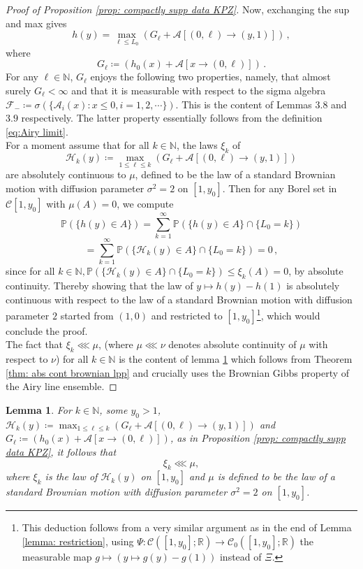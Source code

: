 \documentclass[12pt]{report}
\theoremstyle{plain}
\newtheorem{lemma}[theorem]{Lemma}
\newcommand{\N}{\ensuremath{\mathbb{N}}}
\newcommand{\R}{\ensuremath{\mathbb{R}}}
\begin{document}
\begin{proof}[Proof of Proposition \ref{prop: compactly supp data KPZ}]
    Now, exchanging the sup and max gives
    \[
    h(y) = \max_{\ell\leq L_0}(G_{\ell}+\mathcal{A}[(0,\ell)\to (y,1)])\,,
    \]
    where
    \[
    G_\ell \coloneqq (h_0(x)+\mathcal{A}[x\to(0,\ell)])\,.
    \]
    For any $\ell\in\N$, $G_{\ell}$ enjoys the following two properties, namely, that almost surely $G_{\ell}<\infty$ and that it is measurable with respect to the sigma algebra $\mathcal{F}_{-}\coloneqq \sigma(\{\mathcal{A}_i(x):x\leq0,i=1,2,\cdots\})$. This is the content of Lemmas $3.8$ and $3.9$ respectively. The latter property essentially follows from the definition \ref{eq:Airy limit}.\\

    For a moment assume that for all $k\in \N$, the laws $\xi_k$ of 
    \[
    \mathcal{H}_k(y) \coloneqq \max_{1\leq\ell\leq k}(G_{\ell}+\mathcal{A}[(0,\ell)\to (y,1)])
    \] 
    are absolutely continuous to $\mu$, defined to be the law of a standard Brownian motion with diffusion parameter $\sigma^2 = 2$ on $[1,y_0]$. Then for any Borel set in $\mathcal{C}[1,y_0]$ with $\mu(A) = 0$, we compute 
    \[
    \mathbb{P}(\{h(y)\in A\}) = \displaystyle \sum_{k=1}^\infty \mathbb{P}(\{h(y)\in A\}\cap\{L_0 = k\}) \]
    \[
    = \displaystyle \sum_{k=1}^\infty \mathbb{P}(\{\mathcal{H}_k(y)\in A\}\cap\{L_0 = k\}) = 0\,,
    \]
    since for all $k\in\N,\mathbb{P}(\{\mathcal{H}_k(y)\in A\}\cap\{L_0 = k\})\leq\xi_k(A) = 0$, by absolute continuity. Thereby showing that the law of $y\mapsto h(y)-h(1)$ is absolutely continuous with respect to the law of a standard Brownian motion with diffusion parameter $2$ started from $(1,0)$ and restricted to $[1,y_0]$\footnote{This deduction follows from a very similar argument as in the end of Lemma \ref{lemma: restriction}, using $\Psi: \mathcal{C}([1,y_0];\R) \to \mathcal{C}_0([1,y_0];\R)$ the measurable map $g\mapsto (y\mapsto g(y)-g(1))$ instead of $\Xi$.}, which would conclude the proof.\\
    
    The fact that $\xi_k\lll\mu$, (where $\mu\lll\nu$ denotes absolute continuity of $\mu$ with respect to $\nu$) for all $k\in\N$ is the content of lemma \ref{lemma: Gibbs} which follows from Theorem \ref{thm: abs cont brownian lpp} and crucially uses the Brownian Gibbs property of the Airy line ensemble.
\end{proof}



\begin{lemma}\label{lemma: Gibbs}
For $k\in\N$, some $y_0>1$, $\mathcal{H}_k(y) \coloneqq \displaystyle\max_{1\leq\ell\leq k}(G_{\ell}+\mathcal{A}[(0,\ell)\to (y,1)])$ and $G_\ell \coloneqq (h_0(x)+\mathcal{A}[x\to(0,\ell)])$, as in Proposition \ref{prop: compactly supp data KPZ}, it follows that \[
\xi_k\lll\mu,\]
where $\xi_k$ is the law of $\mathcal{H}_k(y)$ on $[1,y_0]$ and $\mu$ is defined to be the law of a standard Brownian motion with diffusion parameter $\sigma^2 = 2$ on $[1,y_0]$.
\end{lemma}
\end{document}
